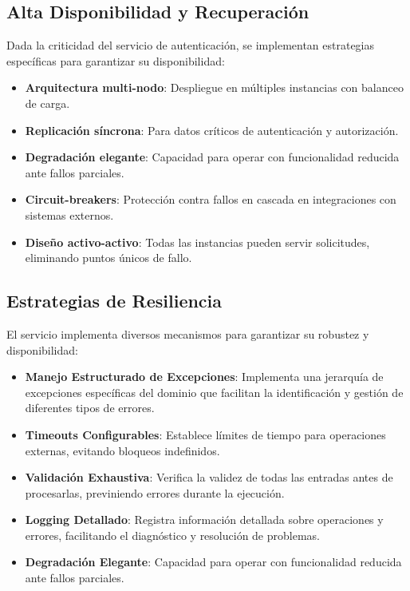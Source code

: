 \documentclass[12pt,a4paper]{article}
\begin{document}
\subsection{Alta Disponibilidad y Recuperación}
\label{subsec:as-disponibilidad}

Dada la criticidad del servicio de autenticación, se implementan estrategias específicas para garantizar su disponibilidad:

\begin{itemize}
    \item \textbf{Arquitectura multi-nodo}: Despliegue en múltiples instancias con balanceo de carga.
    
    \item \textbf{Replicación síncrona}: Para datos críticos de autenticación y autorización.
    
    \item \textbf{Degradación elegante}: Capacidad para operar con funcionalidad reducida ante fallos parciales.
    
    \item \textbf{Circuit-breakers}: Protección contra fallos en cascada en integraciones con sistemas externos.
    
    \item \textbf{Diseño activo-activo}: Todas las instancias pueden servir solicitudes, eliminando puntos únicos de fallo.
    
\end{itemize}

\subsection{Estrategias de Resiliencia}
\label{subsec:as-resiliencia}

El servicio implementa diversos mecanismos para garantizar su robustez y disponibilidad:

\begin{itemize}
    \item \textbf{Manejo Estructurado de Excepciones}: Implementa una jerarquía de excepciones específicas del dominio que facilitan la identificación y gestión de diferentes tipos de errores.
    
    \item \textbf{Timeouts Configurables}: Establece límites de tiempo para operaciones externas, evitando bloqueos indefinidos.
    
    \item \textbf{Validación Exhaustiva}: Verifica la validez de todas las entradas antes de procesarlas, previniendo errores durante la ejecución.
    
    \item \textbf{Logging Detallado}: Registra información detallada sobre operaciones y errores, facilitando el diagnóstico y resolución de problemas.
    
    \item \textbf{Degradación Elegante}: Capacidad para operar con funcionalidad reducida ante fallos parciales.
    
\end{itemize}
\end{document}
